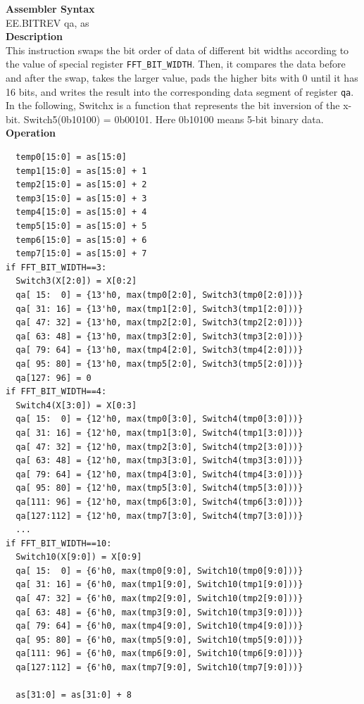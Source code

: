 \textbf{Assembler Syntax} \\
EE.BITREV qa, as \\
\textbf{Description} \\
This instruction swaps the bit order of data of different bit widths according to the value of special register \lstinline{FFT_BIT_WIDTH}. Then, it compares the data before and after the swap, takes the larger value, pads the higher bits with 0 until it has 16 bits, and writes the result into the corresponding data segment of register \lstinline{qa}. In the following, Switchx is a function that represents the bit inversion of the x-bit. Switch5(0b10100) = 0b00101. Here 0b10100 means 5-bit binary data.\\
\textbf{Operation}
\begin{lstlisting}
  temp0[15:0] = as[15:0]
  temp1[15:0] = as[15:0] + 1
  temp2[15:0] = as[15:0] + 2
  temp3[15:0] = as[15:0] + 3
  temp4[15:0] = as[15:0] + 4
  temp5[15:0] = as[15:0] + 5
  temp6[15:0] = as[15:0] + 6
  temp7[15:0] = as[15:0] + 7
if FFT_BIT_WIDTH==3:
  Switch3(X[2:0]) = X[0:2]
  qa[ 15:  0] = {13'h0, max(tmp0[2:0], Switch3(tmp0[2:0]))}
  qa[ 31: 16] = {13'h0, max(tmp1[2:0], Switch3(tmp1[2:0]))}
  qa[ 47: 32] = {13'h0, max(tmp2[2:0], Switch3(tmp2[2:0]))}
  qa[ 63: 48] = {13'h0, max(tmp3[2:0], Switch3(tmp3[2:0]))}
  qa[ 79: 64] = {13'h0, max(tmp4[2:0], Switch3(tmp4[2:0]))}
  qa[ 95: 80] = {13'h0, max(tmp5[2:0], Switch3(tmp5[2:0]))}
  qa[127: 96] = 0
if FFT_BIT_WIDTH==4:
  Switch4(X[3:0]) = X[0:3]
  qa[ 15:  0] = {12'h0, max(tmp0[3:0], Switch4(tmp0[3:0]))}
  qa[ 31: 16] = {12'h0, max(tmp1[3:0], Switch4(tmp1[3:0]))}
  qa[ 47: 32] = {12'h0, max(tmp2[3:0], Switch4(tmp2[3:0]))}
  qa[ 63: 48] = {12'h0, max(tmp3[3:0], Switch4(tmp3[3:0]))}
  qa[ 79: 64] = {12'h0, max(tmp4[3:0], Switch4(tmp4[3:0]))}
  qa[ 95: 80] = {12'h0, max(tmp5[3:0], Switch4(tmp5[3:0]))}
  qa[111: 96] = {12'h0, max(tmp6[3:0], Switch4(tmp6[3:0]))}
  qa[127:112] = {12'h0, max(tmp7[3:0], Switch4(tmp7[3:0]))}
  ...
if FFT_BIT_WIDTH==10:
  Switch10(X[9:0]) = X[0:9]
  qa[ 15:  0] = {6'h0, max(tmp0[9:0], Switch10(tmp0[9:0]))}
  qa[ 31: 16] = {6'h0, max(tmp1[9:0], Switch10(tmp1[9:0]))}
  qa[ 47: 32] = {6'h0, max(tmp2[9:0], Switch10(tmp2[9:0]))}
  qa[ 63: 48] = {6'h0, max(tmp3[9:0], Switch10(tmp3[9:0]))}
  qa[ 79: 64] = {6'h0, max(tmp4[9:0], Switch10(tmp4[9:0]))}
  qa[ 95: 80] = {6'h0, max(tmp5[9:0], Switch10(tmp5[9:0]))}
  qa[111: 96] = {6'h0, max(tmp6[9:0], Switch10(tmp6[9:0]))}
  qa[127:112] = {6'h0, max(tmp7[9:0], Switch10(tmp7[9:0]))}

  as[31:0] = as[31:0] + 8
\end{lstlisting}


